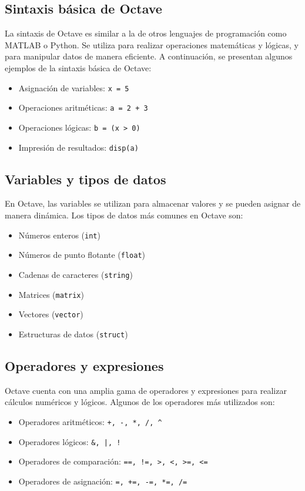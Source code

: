 \documentclass{article}
\begin{document}
\subsection{Sintaxis básica de Octave}
La sintaxis de Octave es similar a la de otros lenguajes de programación como MATLAB o Python. Se utiliza para realizar operaciones matemáticas y lógicas, y para manipular datos de manera eficiente. A continuación, se presentan algunos ejemplos de la sintaxis básica de Octave:

\begin{itemize}
    \item Asignación de variables: \texttt{x = 5}
    \item Operaciones aritméticas: \texttt{a = 2 + 3}
    \item Operaciones lógicas: \texttt{b = (x > 0)}
    \item Impresión de resultados: \texttt{disp(a)}
\end{itemize}

\subsection{Variables y tipos de datos}
En Octave, las variables se utilizan para almacenar valores y se pueden asignar de manera dinámica. Los tipos de datos más comunes en Octave son:

\begin{itemize}
    \item Números enteros (\texttt{int})
    \item Números de punto flotante (\texttt{float})
    \item Cadenas de caracteres (\texttt{string})
    \item Matrices (\texttt{matrix})
    \item Vectores (\texttt{vector})
    \item Estructuras de datos (\texttt{struct})
\end{itemize}

\subsection{Operadores y expresiones}
Octave cuenta con una amplia gama de operadores y expresiones para realizar cálculos numéricos y lógicos. Algunos de los operadores más utilizados son:

\begin{itemize}
    \item Operadores aritméticos: \texttt{+, -, *, /, \^{}}
    \item Operadores lógicos: \texttt{\&, |, !}
    \item Operadores de comparación: \texttt{==, !=, >, <, >=, <=}
    \item Operadores de asignación: \texttt{=, +=, -=, *=, /=}
\end{itemize}
\end{document}
